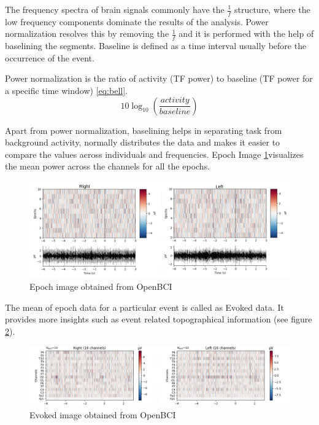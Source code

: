 The frequency spectra of brain signals commonly have the $\frac{1}{f}$ structure, where the low frequency components dominate the results of the analysis. Power normalization resolves this by removing the $\frac{1}{f}$ and it is performed with the help of baselining the segments. Baseline is defined as a time interval usually before the occurrence of the event.

Power normalization is the ratio of activity (TF power) to baseline (TF power for a specific time window) \ref{eq:bell}.
\begin{equation} \label{eq:bell}
    10\log_{10}(\frac{activity}{baseline})
\end{equation}

Apart from power normalization, baselining helps in separating task from background activity, normally distributes the data and makes it easier to compare the values across individuals and frequencies. Epoch Image \ref{fig:obci_ep_image}visualizes the mean power across the channels for all the epochs.

\begin{figure}[H] 
    \begin{center}
    \includegraphics[width=1.0\textwidth]{images/Epoch_Image.png}
    \caption{Epoch image obtained from OpenBCI}
    \label{fig:obci_ep_image}
\end{center}
\end{figure}

The mean of epoch data for a particular event is called as Evoked data. It provides more insights such as event related topographical information (see figure \ref{fig:obci_evk_topo}).

\begin{figure}[H] 
    \begin{center}
    \includegraphics[width=1.0\textwidth]{images/evk_image.png}
    \caption{Evoked image obtained from OpenBCI}
    \label{fig:obci_evk_topo}
\end{center}
\end{figure}

